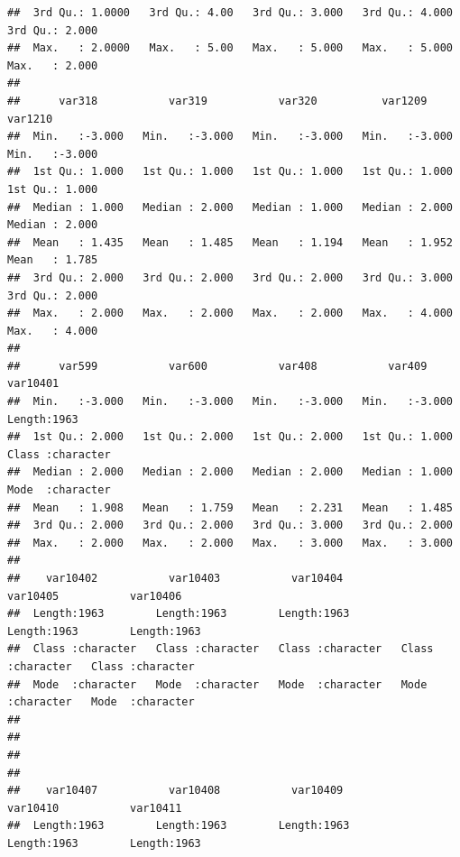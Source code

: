 \documentclass[
]{book}
\begin{document}
\begin{verbatim}
##  3rd Qu.: 1.0000   3rd Qu.: 4.00   3rd Qu.: 3.000   3rd Qu.: 4.000   3rd Qu.: 2.000  
##  Max.   : 2.0000   Max.   : 5.00   Max.   : 5.000   Max.   : 5.000   Max.   : 2.000  
##                                                                                      
##      var318           var319           var320          var1209          var1210      
##  Min.   :-3.000   Min.   :-3.000   Min.   :-3.000   Min.   :-3.000   Min.   :-3.000  
##  1st Qu.: 1.000   1st Qu.: 1.000   1st Qu.: 1.000   1st Qu.: 1.000   1st Qu.: 1.000  
##  Median : 1.000   Median : 2.000   Median : 1.000   Median : 2.000   Median : 2.000  
##  Mean   : 1.435   Mean   : 1.485   Mean   : 1.194   Mean   : 1.952   Mean   : 1.785  
##  3rd Qu.: 2.000   3rd Qu.: 2.000   3rd Qu.: 2.000   3rd Qu.: 3.000   3rd Qu.: 2.000  
##  Max.   : 2.000   Max.   : 2.000   Max.   : 2.000   Max.   : 4.000   Max.   : 4.000  
##                                                                                      
##      var599           var600           var408           var409         var10401        
##  Min.   :-3.000   Min.   :-3.000   Min.   :-3.000   Min.   :-3.000   Length:1963       
##  1st Qu.: 2.000   1st Qu.: 2.000   1st Qu.: 2.000   1st Qu.: 1.000   Class :character  
##  Median : 2.000   Median : 2.000   Median : 2.000   Median : 1.000   Mode  :character  
##  Mean   : 1.908   Mean   : 1.759   Mean   : 2.231   Mean   : 1.485                     
##  3rd Qu.: 2.000   3rd Qu.: 2.000   3rd Qu.: 3.000   3rd Qu.: 2.000                     
##  Max.   : 2.000   Max.   : 2.000   Max.   : 3.000   Max.   : 3.000                     
##                                                                                        
##    var10402           var10403           var10404           var10405           var10406        
##  Length:1963        Length:1963        Length:1963        Length:1963        Length:1963       
##  Class :character   Class :character   Class :character   Class :character   Class :character  
##  Mode  :character   Mode  :character   Mode  :character   Mode  :character   Mode  :character  
##                                                                                                
##                                                                                                
##                                                                                                
##                                                                                                
##    var10407           var10408           var10409           var10410           var10411        
##  Length:1963        Length:1963        Length:1963        Length:1963        Length:1963       

\end{verbatim}
\end{document}
